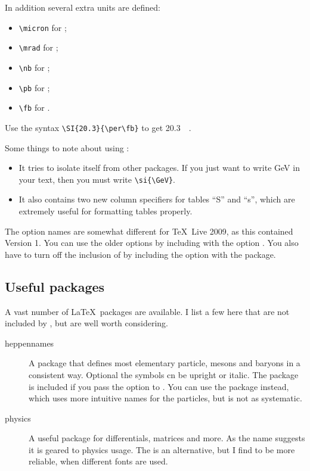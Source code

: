 In addition several extra units are defined:
\begin{itemize}
\item \verb|\micron| for \si{\micron};
\item \verb|\mrad| for \si{\mrad};
\item \verb|\nb| for \si{\nb};
\item \verb|\pb| for \si{\pb};
\item \verb|\fb| for \si{\fb}.
\end{itemize}
Use the syntax \verb|\SI{20.3}{\per\fb}| to get \SI{20.3}{\per\fb}.

Some things to note about using :
\begin{itemize}
\item It tries to isolate itself from other packages.
  If you just want to write \si{\GeV} in your text,
  then you must write \verb|\si{\GeV}|.
\item It also contains two new column specifiers for tables ``S'' and ``s'',
  which are extremely useful for formatting tables properly.
\end{itemize}

The option names are somewhat different for \TeX\ Live 2009,
as this contained  Version 1.
You can use the older options by including  with the 
option .
You also have to turn off the inclusion of  by including the option  with
the  package.

\subsection{Useful packages}

A vast number of \LaTeX\ packages are available.
I list a few here that are not included by ,
but are well worth considering.
\begin{description}
  \item[heppennames] A package that defines most elementary particle, mesons and baryons in a
  consistent way. Optional the symbols cn be upright or italic.
  The package is included if you pass the option  to .
  You can use the package  instead, which uses more intuitive names for the particles,
  but is not as systematic.
  \item[physics] A useful package for differentials, matrices and more.
  As the name suggests it is geared to physics usage.
  The is an alternative, but I find  to be more reliable,
  when different fonts are used.
\end{description}

